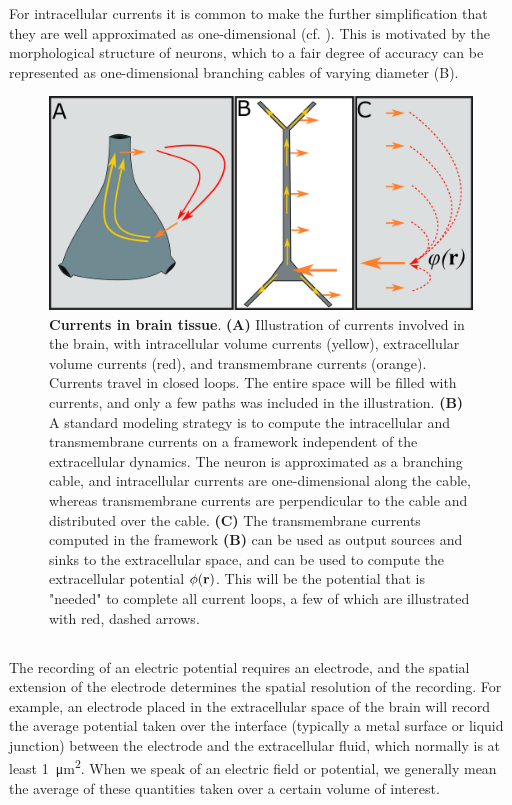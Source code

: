 For intracellular currents it is common to make the further simplification that they are well approximated as one-dimensional (cf. ). This is motivated by the morphological structure of neurons, which to a fair degree of accuracy can be represented as one-dimensional branching cables of varying diameter (B).

\begin{figure}[!ht]
\begin{center}
\includegraphics[width=1.0\textwidth]{Figures/Basics/Twostep.png}
\end{center}
\caption{{\bf Currents in brain tissue}. {\bf(A)} Illustration of currents involved in the brain, with intracellular volume currents (yellow), extracellular volume currents (red), and transmembrane currents (orange). Currents travel in closed loops. The entire space will be filled with currents, and only a few paths was included in the illustration. {\bf(B)} A standard modeling strategy is to compute the intracellular and transmembrane currents on a framework independent of the extracellular dynamics. The neuron is approximated as a branching cable, and intracellular currents are one-dimensional along the cable, whereas transmembrane currents are perpendicular to the cable and distributed over the cable. {\bf(C)} The transmembrane currents computed in the framework {\bf(B)} can be used as output sources and sinks to the extracellular space, and can be used to compute the extracellular potential $\phi({\bf r})$. This will be the potential that is "needed" to complete all current loops, a few of which are illustrated with red, dashed arrows.
}
\label{fig:Basics:Twostep}
\end{figure}


\subsection{}
\label{sec:Basics:ECSpot}
The recording of an electric potential requires an electrode, and the spatial extension of the electrode determines the spatial resolution of the recording. For example, an electrode placed in the extracellular space of the brain will record the average potential taken over the interface (typically a metal surface or liquid junction) between the electrode and the extracellular fluid, which normally is at least 1~\si{\square\micro\metre}. When we speak of an electric field or potential, we generally mean the average of these quantities taken over a certain volume of interest. 

